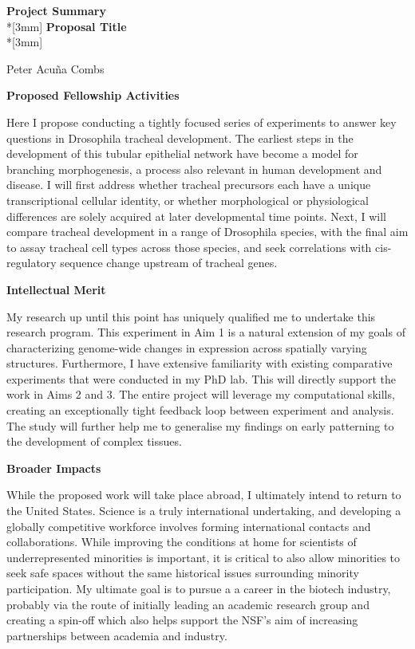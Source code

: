 \documentclass{proposal}
\begin{document}
\begin{center}
{\Large{\bf Project Summary}}\\*[3mm]
{\bf Proposal Title} \\*[3mm]

Peter Acu\~na Combs \\

\end{center}

\noindent
{\bf Proposed Fellowship Activities}

Here I propose conducting a tightly focused series of experiments to answer key questions in Drosophila tracheal development. The earliest steps in the development of this tubular epithelial network have become a model for branching morphogenesis, a process also relevant in human development and disease. I will first address whether tracheal precursors each have a unique transcriptional cellular identity, or whether morphological or physiological differences are solely acquired at later developmental time points. Next, I will compare tracheal development in a range of Drosophila species, with the final aim to assay tracheal cell types across those species, and seek correlations with cis-regulatory sequence change upstream of tracheal genes.

\noindent
{\bf Intellectual Merit}

My research up until this point has uniquely qualified me to undertake this research program. This experiment in Aim 1 is a natural extension of my goals of characterizing genome-wide changes in expression across spatially varying structures.  Furthermore,  I have extensive familiarity with existing comparative experiments that were conducted in my PhD lab. This will directly support the work in Aims 2 and 3. The entire project will leverage my computational skills, creating an exceptionally tight feedback loop between experiment and analysis. The study will further help me to generalise my findings on early patterning to the development of complex tissues.

\noindent
{\bf Broader Impacts}

While the proposed work will take place abroad, I ultimately intend to return to the United States.  Science is a truly international undertaking, and developing a globally competitive workforce involves forming international contacts and collaborations. While improving the conditions at home for scientists of underrepresented minorities is important, it is critical to also allow minorities to seek safe spaces without the same historical issues surrounding minority participation.  My ultimate goal is to pursue a a career in the biotech industry, probably via the route of initially leading an academic research group and creating a spin-off which also helps support the NSF's aim of increasing partnerships between academia and industry. 
\end{document}
